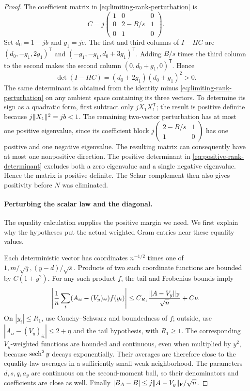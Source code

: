 \begin{proof}
The coefficient matrix in \eqref{eq:limiting-rank-perturbation} is
\[
 C=j\begin{pmatrix}1&0&0\\0&2-B/s&1\\0&1&0\end{pmatrix}.
\]
Set $d_0=1-jb$ and $g_1=je$.  The first and third columns of $I-HC$
are $(d_0,-g_1,2g_1)^{\mathsf T}$ and
$(-g_1,-g_1,d_0+3g_1)^{\mathsf T}$.  Adding $B/s$ times the third
column to the second makes the second column
$(0,d_0+g_1,0)^{\mathsf T}$.  Hence
\begin{equation}
 \det(I-HC)=(d_0+2g_1)(d_0+g_1)^2>0.
 \label{eq:positive-rank-determinant}
\end{equation}
The same determinant is obtained from the identity minus
\eqref{eq:limiting-rank-perturbation} on any ambient space containing
its three vectors. To determine its sign as a quadratic form, first
subtract only
$jX_1X_1^{\mathsf T}$; the result is positive definite because
$j\lVert X_1\rVert^2=jb<1$.  The remaining two-vector perturbation has at
most one positive eigenvalue, since its coefficient block
$j\left(\begin{smallmatrix}2-B/s&1\\1&0\end{smallmatrix}\right)$
has one positive and one negative eigenvalue. The resulting matrix can
consequently have at most one nonpositive
direction. The positive determinant in
\eqref{eq:positive-rank-determinant} excludes both a zero eigenvalue
and a single negative eigenvalue. Hence the matrix is positive definite.
The Schur complement then also gives positivity before $N$ was eliminated.

\paragraph{Perturbing the scalar law and the diagonal.}
The equality calculation supplies the positive margin we need. We first
explain why the hypotheses put the actual weighted Gram entries near
these equality values.

Each deterministic vector has coordinates $n^{-1/2}$ times
one of $1,m/\sqrt q,(y-d)/\sqrt s$.  Products of two such coordinate
functions are bounded by $C(1+y^2)$.  For any such product $f$, the
tail and Frobenius bounds imply
\begin{equation}
 \left|\frac1n\sum_i(A_{ii}-(V_y)_{ii})f(y_i)\right|
 \le C_{R_1}\frac{\lVert A-V_y\rVert_{\mathrm F}}{\sqrt n}+C\nu.
 \label{eq:A-moment-comparison}
\end{equation}
On $|y_i|\le R_1$, use Cauchy--Schwarz and boundedness of $f$; outside,
use $|A_{ii}-(V_y)_{ii}|\le2+\eta$ and the tail hypothesis, with
$R_1\ge1$.  The corresponding $V_y$-weighted functions are bounded
and continuous, even when multiplied by $y^2$, because
$\operatorname{sech}^2 y$ decays exponentially.  Their averages are therefore close
to the equality-law averages in a sufficiently small weak
neighborhood.  The parameters $d,s,q,a_y$ are continuous on the
second-moment ball, so their denominators and coefficients are close
as well.  Finally $|B_A-B|\le j\lVert A-V_y\rVert_{\mathrm F}/\sqrt n$.


\end{proof}
